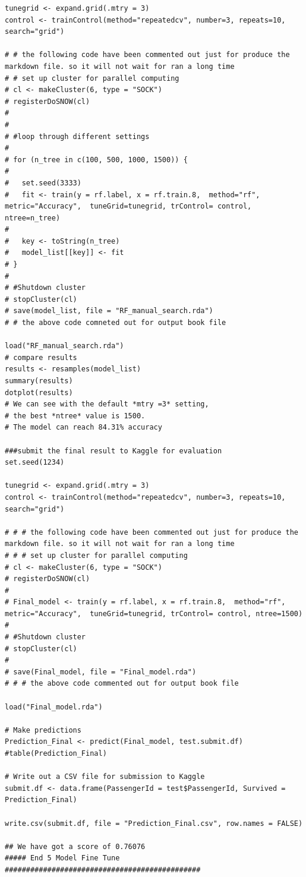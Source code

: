 \documentclass[
]{book}
\begin{document}
\begin{verbatim}
tunegrid <- expand.grid(.mtry = 3)
control <- trainControl(method="repeatedcv", number=3, repeats=10, search="grid")

# # the following code have been commented out just for produce the markdown file. so it will not wait for ran a long time
# # set up cluster for parallel computing
# cl <- makeCluster(6, type = "SOCK")
# registerDoSNOW(cl)
#
#
# #loop through different settings
#
# for (n_tree in c(100, 500, 1000, 1500)) {
#
#   set.seed(3333)
#   fit <- train(y = rf.label, x = rf.train.8,  method="rf", metric="Accuracy",  tuneGrid=tunegrid, trControl= control, ntree=n_tree)
#
#   key <- toString(n_tree)
#   model_list[[key]] <- fit
# }
#
# #Shutdown cluster
# stopCluster(cl)
# save(model_list, file = "RF_manual_search.rda")
# # the above code comneted out for output book file

load("RF_manual_search.rda")
# compare results
results <- resamples(model_list)
summary(results)
dotplot(results)
# We can see with the default *mtry =3* setting,
# the best *ntree* value is 1500.
# The model can reach 84.31% accuracy

###submit the final result to Kaggle for evaluation
set.seed(1234)

tunegrid <- expand.grid(.mtry = 3)
control <- trainControl(method="repeatedcv", number=3, repeats=10, search="grid")

# # # the following code have been commented out just for produce the markdown file. so it will not wait for ran a long time
# # # set up cluster for parallel computing
# cl <- makeCluster(6, type = "SOCK")
# registerDoSNOW(cl)
#
# Final_model <- train(y = rf.label, x = rf.train.8,  method="rf", metric="Accuracy",  tuneGrid=tunegrid, trControl= control, ntree=1500)
#
# #Shutdown cluster
# stopCluster(cl)
#
# save(Final_model, file = "Final_model.rda")
# # # the above code commented out for output book file

load("Final_model.rda")

# Make predictions
Prediction_Final <- predict(Final_model, test.submit.df)
#table(Prediction_Final)

# Write out a CSV file for submission to Kaggle
submit.df <- data.frame(PassengerId = test$PassengerId, Survived = Prediction_Final)

write.csv(submit.df, file = "Prediction_Final.csv", row.names = FALSE)

## We have got a score of 0.76076
##### End 5 Model Fine Tune ##############################################
\end{verbatim}
\end{document}
